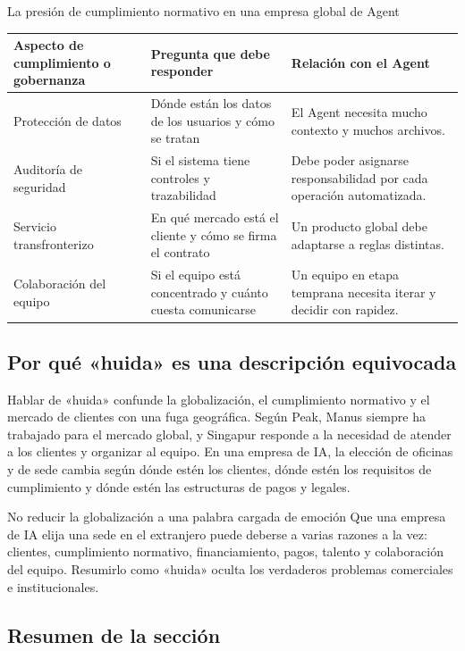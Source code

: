 \documentclass[a4paper]{article}
\begin{document}
\begin{knowledgebox}{La presión de cumplimiento normativo en una empresa global de Agent}
\begin{tabularx}{\textwidth}{p{}p{}X}
\toprule
Aspecto de cumplimiento o gobernanza & Pregunta que debe responder & Relación con el Agent \\
\midrule
Protección de datos & Dónde están los datos de los usuarios y cómo se tratan & El Agent necesita mucho contexto y muchos archivos. \\
Auditoría de seguridad & Si el sistema tiene controles y trazabilidad & Debe poder asignarse responsabilidad por cada operación automatizada. \\
Servicio transfronterizo & En qué mercado está el cliente y cómo se firma el contrato & Un producto global debe adaptarse a reglas distintas. \\
Colaboración del equipo & Si el equipo está concentrado y cuánto cuesta comunicarse & Un equipo en etapa temprana necesita iterar y decidir con rapidez. \\
\bottomrule
\end{tabularx}
\end{knowledgebox}

\subsection{Por qué «huida» es una descripción equivocada}

Hablar de «huida» confunde la globalización, el cumplimiento normativo y el mercado de clientes con una fuga geográfica. Según Peak, Manus siempre ha trabajado para el mercado global, y Singapur responde a la necesidad de atender a los clientes y organizar al equipo. En una empresa de IA, la elección de oficinas y de sede cambia según dónde estén los clientes, dónde estén los requisitos de cumplimiento y dónde estén las estructuras de pagos y legales.

\begin{warningbox}{No reducir la globalización a una palabra cargada de emoción}
Que una empresa de IA elija una sede en el extranjero puede deberse a varias razones a la vez: clientes, cumplimiento normativo, financiamiento, pagos, talento y colaboración del equipo. Resumirlo como «huida» oculta los verdaderos problemas comerciales e institucionales.
\end{warningbox}

\subsection{Resumen de la sección}
\end{document}
